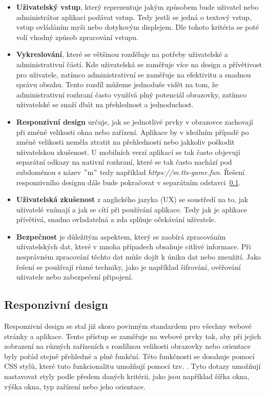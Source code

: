 \begin{itemize}
    \item \textbf{Uživatelský vstup}, který reprezentuje jakým způsobem bude uživatel nebo administrátor aplikaci podávat vstup. Tedy jestli se jedná o textový vstup, vstup ovládáním myši nebo dotykovým displejem. Dle tohoto kritéria se poté volí vhodný způsob zpracování vstupu.
    \item \textbf{Vykreslování}, které se většinou rozděluje na potřeby uživatelské a administrativní částí. Kde uživatelská se zaměřuje více na design a přívětivost pro uživatele, zatímco administrativní se zaměřuje na efektivitu a snadnou správu obsahu. Tento rozdíl můžeme jednoduše vidět na tom, že administrativní rozhraní často využívá plný potenciál obrazovky, zatímco uživatelské se snaží dbát na přehlednost a jednoduchost.
    \item \textbf{Responzivní design} určuje, jak se jednotlivé prvky v obrazovce zachovají při změně velikosti okna nebo zařízení. Aplikace by v ideálním případě po změně velikosti neměla ztratit na přehlednosti nebo jakkoliv poškodit uživatelskou zkušenost. U mobilních verzí aplikací se tak často objevují separátní odkazy na nativní rozhraní, které se tak často nachází pod subdoménou s název \("\)m\("\) tedy například \textit{https://m.tts-game.fun}. Řešení responzivního designu dále bude pokračovat v separátním odstavci~\ref{subsec:ui-gui-theory-responsive-design}.
    \item \textbf{Uživatelská zkušenost} z anglického jazyka \textit{} (UX) se soustředí na to, jak uživatelé vnímají a jak se cítí při používání aplikace. Tedy jak je aplikace přívětivá, snadno ovladatelná a zda splňuje očekávání uživatele.
    \item \textbf{Bezpečnost} je důležitým aspektem, který se zaobírá zpracováním uživatelských dat, které v mnoha případech obsahuje citlivé informace. Při nesprávném zpracování těchto dat může dojít k úniku dat nebo zneužití. Jako řešení se používají různé techniky, jako je například šifrování, ověřování uživatele nebo zabezpečení připojení.
\end{itemize}

\subsection{Responzivní design}
\label{subsec:ui-gui-theory-responsive-design}
Responzivní design se stal již skoro povinným standardem pro všechny webové stránky a aplikace. Tento přístup se zaměřuje na webové prvky tak, aby při jejich zobrazení na různých zařízeních s rozdílnou velikosti obrazovky nebo orientace byly pořád stejně přehledné a plně funkční. Této funkčnosti se dosahuje pomocí CSS stylů, které tuto funkcionalitu umožňují pomocí tzv. \textit{}. Tyto dotazy umožňují nastavovat styly podle předem daných kritérii, jako jsou například šířka okna, výška okna, typ zařízení nebo jeho orientace.

